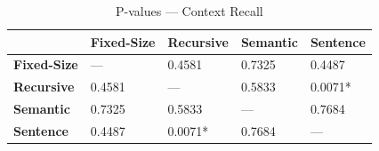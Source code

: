 \begin{table}
\caption{P-values — Context Recall}
\label{tab:pvalues_context_recall}
\begin{tabular}{lllll}
\toprule
 & Fixed-Size & Recursive & Semantic & Sentence \\
\midrule
\textbf{Fixed-Size} & — & 0.4581 & 0.7325 & 0.4487 \\
\textbf{Recursive} & 0.4581 & — & 0.5833 & 0.0071* \\
\textbf{Semantic} & 0.7325 & 0.5833 & — & 0.7684 \\
\textbf{Sentence} & 0.4487 & 0.0071* & 0.7684 & — \\
\bottomrule
\end{tabular}
\end{table}
